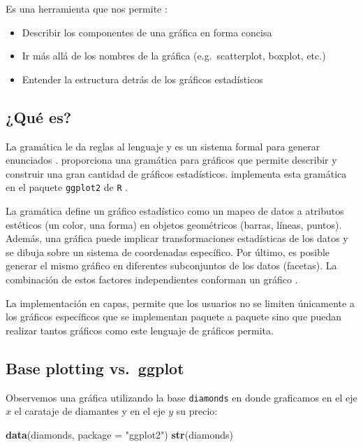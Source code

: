\documentclass[]{article}
\newenvironment{Shaded}{\begin{snugshade}}{\end{snugshade}}
\newcommand{\KeywordTok}[1]{\textcolor[rgb]{0.13,0.29,0.53}{\textbf{#1}}}
\newcommand{\DataTypeTok}[1]{\textcolor[rgb]{0.13,0.29,0.53}{#1}}
\newcommand{\StringTok}[1]{\textcolor[rgb]{0.31,0.60,0.02}{#1}}
\newcommand{\NormalTok}[1]{#1}
\providecommand{\tightlist}{%
  \setlength{\itemsep}{0pt}\setlength{\parskip}{0pt}}
\begin{document}
Es una herramienta que nos permite \parencite{wickham2010layered}:

\begin{itemize}
\tightlist
\item
  Describir los componentes de una gráfica en forma concisa
\item
  Ir más allá de los nombres de la gráfica (e.g.~scatterplot, boxplot,
  etc.)
\item
  Entender la estructura detrás de los gráficos estadísticos
\end{itemize}

\subsection{¿Qué es?}\label{que-es}

La gramática le da reglas al lenguaje y es un sistema formal para
generar enunciados \parencite{wilkinson2006grammar}.
\textcite{wilkinson2006grammar} proporciona una gramática para gráficos
que permite describir y construir una gran cantidad de gráficos
estadísticos. \parencite{wickham2010layered} implementa esta gramática
en el paquete \texttt{ggplot2} de \texttt{R} \parencite{ggplot2}.

La gramática define un gráfico estadístico como un mapeo de datos a
atributos estéticos (un color, una forma) en objetos geométricos
(barras, líneas, puntos). Además, una gráfica puede implicar
transformaciones estadísticas de los datos y se dibuja sobre un sistema
de coordenadas específico. Por último, es posible generar el mismo
gráfico en diferentes subconjuntos de los datos (facetas). La
combinación de estos factores independientes conforman un gráfico
\parencite[][p. 5]{ggplot2}.

La implementación en capas, permite que los usuarios no se limiten
únicamente a los gráficos específicos que se implementan paquete a
paquete sino que puedan realizar tantos gráficos como este lenguaje de
gráficos permita.

\subsection{Base plotting vs.~ggplot}\label{base-plotting-vs.ggplot}

Observemos una gráfica utilizando la base \texttt{diamonds} en donde
graficamos en el eje \(x\) el carataje de diamantes y en el eje \(y\) su
precio:

\begin{Shaded}
\begin{Highlighting}[]
\KeywordTok{data}\NormalTok{(diamonds, }\DataTypeTok{package =} \StringTok{"ggplot2"}\NormalTok{)}
\KeywordTok{str}\NormalTok{(diamonds)}
\end{Highlighting}
\end{Shaded}
\end{document}
